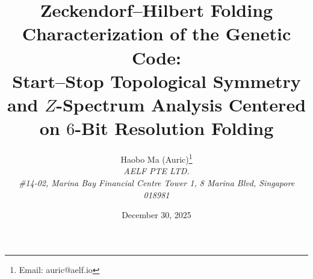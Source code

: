 \documentclass[11pt,a4paper]{article}
\title{Zeckendorf--Hilbert Folding Characterization of the Genetic Code:\\
Start--Stop Topological Symmetry and \texorpdfstring{$Z$}{Z}-Spectrum Analysis Centered on \texorpdfstring{$6$}{6}-Bit Resolution Folding}
\author{Haobo Ma (Auric)\thanks{Email: auric@aelf.io} \\
\textit{AELF PTE LTD.} \\
\textit{\#14-02, Marina Bay Financial Centre Tower 1, 8 Marina Blvd, Singapore 018981}}
\date{December 30, 2025}
\begin{document}
\maketitle











\FloatBarrier
\appendix


\FloatBarrier

\end{document}
